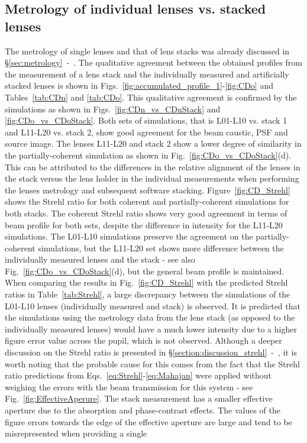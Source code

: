 \begin{refsection}
\subsection{Metrology of individual lenses vs. stacked lenses}\label{sec:stacking}

The metrology of single lenses and that of lens stacks was already discussed in \S\ref{sec:metrology}~-~\textit{}. The qualitative agreement between the obtained profiles from the measurement of a lens stack and the individually measured and artificially stacked lenses is shown in Figs.~\ref{fig:accumulated_profile_1}-\ref{fig:CDo} and Tables~\ref{tab:CDn} and \ref{tab:CDo}. This qualitative agreement is confirmed by the simulations as shown in Figs.~\ref{fig:CDn_vs_CDnStack} and \ref{fig:CDo_vs_CDoStack}. Both sets of simulations, that is L01-L10 vs. stack 1 and L11-L20 vs. stack 2, show good agreement for the beam caustic, PSF and source image. The lenses L11-L20 and stack 2 show a lower degree of similarity in the partially-coherent simulation as shown in Fig.~\ref{fig:CDo_vs_CDoStack}(d). This can be attributed to the differences in the relative alignment of the lenses in the stack versus the lens holder in the individual measurements when performing the lenses metrology and subsequent software stacking. Figure~\ref{fig:CD_Strehl} shows the Strehl ratio for both coherent and partially-coherent simulations for both stacks. The coherent Strehl ratio shows very good agreement in terms of beam profile for both sets, despite the difference in intensity for the L11-L20 simulations. The L01-L10 simulations preserve the agreement on the partially-coherent simulations, but the L11-L20 set shows more difference between the individually measured lenses and the stack - see also Fig.~\ref{fig:CDo_vs_CDoStack}(d), but the general beam profile is maintained. When comparing the results in Fig.~\ref{fig:CD_Strehl} with the predicted Strehl ratios in Table~\ref{tab:Strehl}, a large discrepancy between the simulations of the L01-L10 lenses (individually measured and stack) is observed. It is predicted that the simulations using the metrology data from the lens stack (as opposed to the individually measured lenses) would have a much lower intensity due to a higher figure error value across the pupil, which is not observed. Although a deeper discussion on the Strehl ratio is presented in \S\ref{section:discussion_strehl}~-~\textit{}, it is worth noting that the probable cause for this comes from the fact that the Strehl ratio predictions from Eqs.~\ref{eq:Strehl}-\ref{eq:Mahajan} were applied without weighing the errors with the beam transmission for this system - see Fig.~\ref{fig:EffectiveAperure}. The stack measurement has a smaller effective aperture due to the absorption and phase-contrast effects. The values of the figure errors towards the edge of the effective aperture are large and tend to be misrepresented when providing a single 
\end{refsection}
